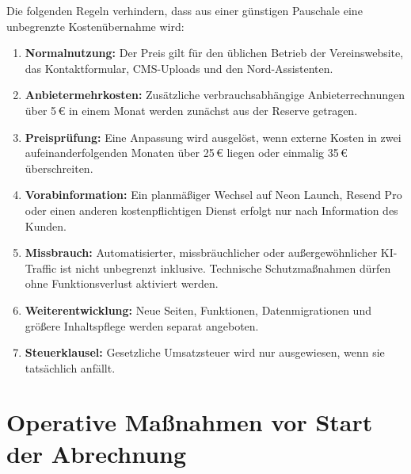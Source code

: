 \documentclass[11pt,a4paper]{article}
\newcommand{\eur}[1]{#1\,€}
\begin{document}
Die folgenden Regeln verhindern, dass aus einer günstigen Pauschale eine unbegrenzte Kostenübernahme wird:

\begin{enumerate}
  \item \textbf{Normalnutzung:} Der Preis gilt für den üblichen Betrieb der Vereinswebsite, das Kontaktformular, CMS-Uploads und den Nord-Assistenten.
  \item \textbf{Anbietermehrkosten:} Zusätzliche verbrauchsabhängige Anbieterrechnungen über \eur{5} in einem Monat werden zunächst aus der Reserve getragen.
  \item \textbf{Preisprüfung:} Eine Anpassung wird ausgelöst, wenn externe Kosten in zwei aufeinanderfolgenden Monaten über \eur{25} liegen oder einmalig \eur{35} überschreiten.
  \item \textbf{Vorabinformation:} Ein planmäßiger Wechsel auf Neon Launch, Resend Pro oder einen anderen kostenpflichtigen Dienst erfolgt nur nach Information des Kunden.
  \item \textbf{Missbrauch:} Automatisierter, missbräuchlicher oder außergewöhnlicher KI-Traffic ist nicht unbegrenzt inklusive. Technische Schutzmaßnahmen dürfen ohne Funktionsverlust aktiviert werden.
  \item \textbf{Weiterentwicklung:} Neue Seiten, Funktionen, Datenmigrationen und größere Inhaltspflege werden separat angeboten.
  \item \textbf{Steuerklausel:} Gesetzliche Umsatzsteuer wird nur ausgewiesen, wenn sie tatsächlich anfällt.
\end{enumerate}

\section{Operative Maßnahmen vor Start der Abrechnung}
\end{document}
